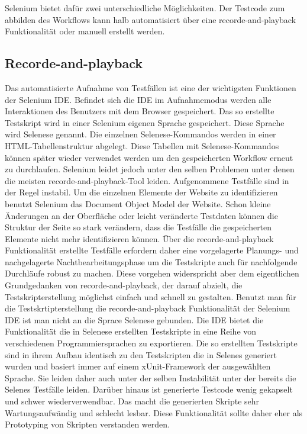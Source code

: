 Selenium bietet dafür zwei unterschiedliche Möglichkeiten. Der Testcode zum abbilden des Workflows kann halb automatisiert über eine recorde-and-playback Funktionalität oder manuell erstellt werden.

\subsection{Recorde-and-playback}
\label{sec:recorde_and_playback}
Das automatisierte Aufnahme von Testfällen ist eine der wichtigsten Funktionen der
Selenium IDE. Befindet sich die IDE im Aufnahmemodus werden alle Interaktionen des Benutzers mit dem Browser gespeichert. Das so erstellte Testskript wird in einer Selenium eigenen Sprache gespeichert. Diese Sprache wird Selenese genannt. Die einzelnen Selenese-Kommandos werden in einer HTML-Tabellenstruktur abgelegt. Diese Tabellen mit Selenese-Kommandos können später wieder verwendet werden um den gespeicherten Workflow erneut zu durchlaufen.
Selenium leidet jedoch unter den selben Problemen unter denen die meisten recorde-and-playback-Tool leiden. Aufgenommene Testfälle sind in der Regel instabil.
Um die einzelnen Elemente der Website zu identifizieren benutzt Selenium das Document Object Model der Website. Schon kleine Änderungen an der Oberfläche oder leicht veränderte Testdaten können die Struktur der Seite so stark verändern, dass die Testfälle die gespeicherten Elemente nicht mehr identifizieren können. Über die recorde-and-playback Funktionalität erstellte Testfälle erfordern daher eine vorgelagerte Planungs- und nachgelagerte Nachtbearbeitungsphase um die Testskripte auch für nachfolgende Durchläufe robust zu machen. Diese vorgehen widerspricht aber dem eigentlichen Grundgedanken von recorde-and-playback, der darauf abzielt, die Testskripterstellung möglichst einfach und schnell zu gestalten.
Benutzt man für die Testskrtipterstellung die recorde-and-playback Funktionalität der Selenium IDE ist man nicht an die Sprace Selenese gebunden. Die IDE bietet die Funktionalität die in Selenese erstellten Testskripte in eine Reihe von verschiedenen Programmiersprachen zu exportieren.
Die so erstellten Testskripte sind in ihrem Aufbau identisch zu den Testskripten die in Selenes generiert wurden und basiert immer auf einem xUnit-Framework der ausgewählten Sprache.
Sie leiden daher auch unter der selben Instabilität unter der bereits die Selenes Testfälle leiden. Darüber hinaus ist generierte Testcode wenig gekapselt und schwer wiederverwendbar. Das macht die generierten Skripte sehr Wartungsaufwändig und schlecht lesbar.
Diese Funktionalität sollte daher eher als Prototyping von Skripten verstanden werden.


